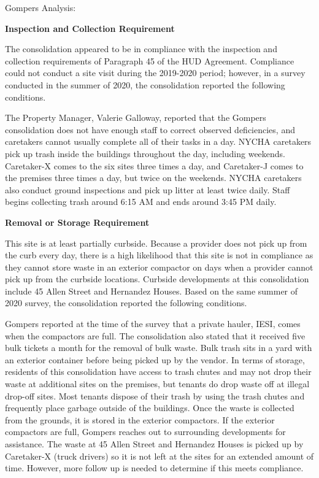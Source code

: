 Gompers Analysis: 

\textbf{Inspection and Collection Requirement} 

 

The consolidation appeared to be in compliance with the inspection and collection requirements of Paragraph 45 of the HUD Agreement. Compliance could not conduct a site visit during the 2019-2020 period; however, in a survey conducted in the summer of 2020, the consolidation reported the following conditions. 

The Property Manager, Valerie Galloway, reported that the Gompers consolidation does not have enough staff to correct observed deficiencies, and caretakers cannot usually complete all of their tasks in a day. NYCHA caretakers pick up trash inside the buildings throughout the day, including weekends. Caretaker-X comes to the six sites three times a day, and Caretaker-J comes to the premises three times a day, but twice on the weekends. NYCHA caretakers also conduct ground inspections and pick up litter at least twice daily. Staff begins collecting trash around 6:15 AM and ends around 3:45 PM daily.

\textbf{Removal or Storage Requirement} 

  

This site is at least partially curbside. Because a provider does not pick up from the curb every day, there is a high likelihood that this site is not in compliance as they cannot store waste in an exterior compactor on days when a provider cannot pick up from the curbside locations. Curbside developments at this consolidation include 45 Allen Street and Hernandez Houses. Based on the same summer of  2020 survey, the consolidation reported the following conditions.

 

Gompers reported at the time of the survey that a private hauler, IESI, comes when the compactors are full. The consolidation also stated that it received five bulk tickets a month for the removal of bulk waste. Bulk trash sits in a yard with an exterior container before being picked up by the vendor.  In terms of storage, residents of this consolidation have access to trash chutes and may not drop their waste at additional sites on the premises, but tenants do drop waste off at illegal drop-off sites.  Most tenants dispose of their trash by using the trash chutes and frequently place garbage outside of the buildings. Once the waste is collected from the grounds, it is stored in the exterior compactors. If the exterior compactors are full, Gompers reaches out to surrounding developments for assistance. The waste at 45 Allen Street and Hernandez Houses is picked up by Caretaker-X (truck drivers) so it is not left at the sites for an extended amount of time. However, more follow up is needed to determine if this meets compliance. 

